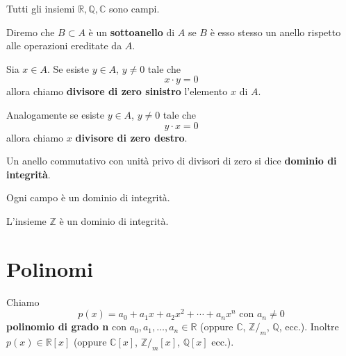 \begin{example}
	Tutti gli insiemi $\mathbb{R}, \mathbb{Q}, \mathbb{C}$ sono campi.
\end{example}

\begin{definition}
	Diremo che $B \subset A$ \`e un \textbf{sottoanello} di $A$ se $B$ \`e esso stesso un
	anello rispetto alle operazioni ereditate da $A$.
\end{definition}

\begin{definition}
	Sia $x \in A$. Se esiste $y \in A$, $y \neq 0$ tale che
	\begin{equation*}
		x \cdot y = 0
	\end{equation*}
	allora chiamo \textbf{divisore di zero sinistro} l'elemento $x$ di $A$.

	Analogamente se esiste $y \in A$, $y \neq 0$ tale che
	\begin{equation*}
		y \cdot x = 0
	\end{equation*}
	allora chiamo $x$ \textbf{divisore di zero destro}.
\end{definition}

\begin{definition}
	Un anello commutativo con unit\`a privo di divisori di zero si dice
	\textbf{dominio	di integrit\`a}.
\end{definition}

\begin{proposition}
	Ogni campo \`e un dominio di integrit\`a.
\end{proposition}

\begin{example}
	L'insieme $\mathbb{Z}$ \`e un dominio di integrit\`a.
\end{example}

\section{Polinomi}

\begin{definition}
	Chiamo
	\begin{equation*}
		p(x) = a_0 + a_1x + a_2x^2 + \cdots + a_n x^n \text{ con $a_n \neq 0$}
	\end{equation*}
	\textbf{polinomio di grado n} con $a_0, a_1, \dots, a_n \in \mathbb{R}$
	(oppure $\mathbb{C}$, $\mathbb{Z}/_m$, $\mathbb{Q}$, ecc.). Inoltre $p(x) \in \mathbb{R}[x]$
	(oppure $\mathbb{C}[x]$, $\mathbb{Z}/_m [x]$, $\mathbb{Q}[x]$ ecc.).
\end{definition}


